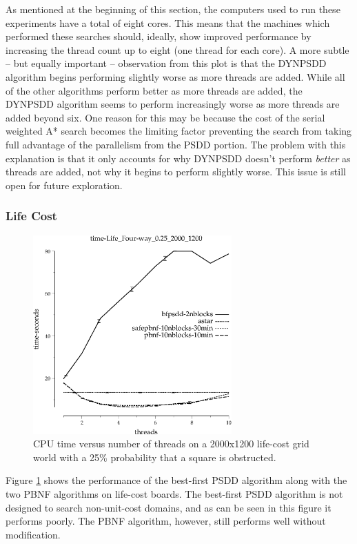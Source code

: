 \documentclass{article}
\begin{document}
 As mentioned at the beginning of this section, the computers used to
 run these experiments have a total of eight cores.  This means that
 the machines which performed these searches should, ideally, show
 improved performance by increasing the thread count up to eight (one
 thread for each core).  A more subtle -- but equally important --
 observation from this plot is that the DYNPSDD algorithm begins
 performing slightly worse as more threads are added.  While all of the
 other algorithms perform better as more threads are added, the DYNPSDD
 algorithm seems to perform increasingly worse as more threads are
 added beyond six.  One reason for this may be because the cost of the
 serial weighted A* search becomes the limiting factor preventing the
 search from taking full advantage of the parallelism from the PSDD
 portion.  The problem with this explanation is that it only accounts
 for why DYNPSDD doesn't perform \emph{better} as threads are added,
 not why it begins to perform slightly worse.  This issue is still open
 for future exploration.

 \subsubsection{Life Cost}

 \begin{figure}[t]
 \includegraphics[width=3in]{images/grid-time-life-fourway-025-2000-1200}
 \caption{CPU time versus number of threads on a 2000x1200 life-cost
   grid world with a 25\% probability that a square is obstructed.}
 \label{fig:grid-life}
 \end{figure}

 Figure \ref{fig:grid-life} shows the performance of the best-first
 PSDD algorithm along with the two PBNF algorithms on life-cost boards.
 The best-first PSDD algorithm is not designed to search non-unit-cost
 domains, and as can be seen in this figure it performs poorly.  The
 PBNF algorithm, however, still performs well without modification.
\end{document}

